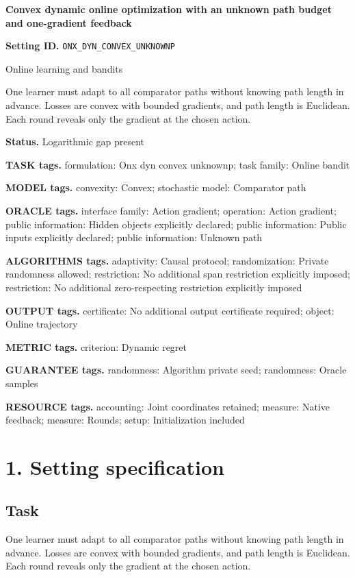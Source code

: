 \documentclass[10pt,a4paper]{article}
\begin{document}
\raggedright

{\LARGE\bfseries\sffamily\color{AtlasNavy} Convex dynamic online optimization with an unknown path budget and one-gradient feedback\par}\vspace{5pt}
\textbf{Setting ID.} \texttt{ONX\_\allowbreak{}DYN\_\allowbreak{}CONVEX\_\allowbreak{}UNKNOWNP}

Online learning and bandits

One learner must adapt to all comparator paths without knowing path length in advance. Losses are convex with bounded gradients, and path length is Euclidean. Each round reveals only the gradient at the chosen action.

\textbf{Status.} Logarithmic gap present

\textbf{TASK tags.} formulation: Onx dyn convex unknownp; task family: Online bandit

\textbf{MODEL tags.} convexity: Convex; stochastic model: Comparator path

\textbf{ORACLE tags.} interface family: Action gradient; operation: Action gradient; public information: Hidden objects explicitly declared; public information: Public inputs explicitly declared; public information: Unknown path

\textbf{ALGORITHMS tags.} adaptivity: Causal protocol; randomization: Private randomness allowed; restriction: No additional span restriction explicitly imposed; restriction: No additional zero-respecting restriction explicitly imposed

\textbf{OUTPUT tags.} certificate: No additional output certificate required; object: Online trajectory

\textbf{METRIC tags.} criterion: Dynamic regret

\textbf{GUARANTEE tags.} randomness: Algorithm private seed; randomness: Oracle samples

\textbf{RESOURCE tags.} accounting: Joint coordinates retained; measure: Native feedback; measure: Rounds; setup: Initialization included

\section{1. Setting specification}
\subsection{Task}
One learner must adapt to all comparator paths without knowing path length in advance. Losses are convex with bounded gradients, and path length is Euclidean. Each round reveals only the gradient at the chosen action.
\end{document}
